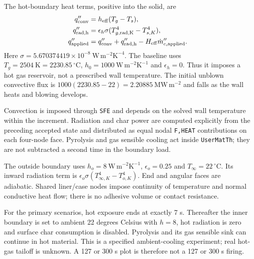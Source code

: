 The hot-boundary heat terms, positive into the solid, are
\begin{align}
 q_{\rm conv}''&=h_{\rm eff}(T_g-T_s),\\
 q_{\rm rad,h}''&=\epsilon_h\sigma(T_{g,\rm rad,K}^4-T_{s,K}^4),\\
 q_{\rm applied}''&=q_{\rm conv}''+q_{\rm rad,h}''-H_{\rm eff}\dot m_{c,\rm applied}''.
\end{align}
Here $\sigma=5.670374419\times10^{-8}\ \mathrm{W\,m^{-2}K^{-4}}$. The baseline uses $T_g=2504\ \mathrm K=2230.85\,^{\circ}\mathrm C$, $h_0=1000\ \mathrm{W\,m^{-2}K^{-1}}$ and $\epsilon_h=0$. Thus it imposes a hot gas reservoir, not a prescribed wall temperature. The initial unblown convective flux is $1000(2230.85-22)=2.20885\ \mathrm{MW\,m^{-2}}$ and falls as the wall heats and blowing develops.

Convection is imposed through \texttt{SFE} and depends on the solved wall temperature within the increment. Radiation and char power are computed explicitly from the preceding accepted state and distributed as equal nodal \texttt{F,HEAT} contributions on each four-node face. Pyrolysis and gas sensible cooling act inside \texttt{UserMatTh}; they are not subtracted a second time in the boundary load.

The outside boundary uses $h_o=8\ \mathrm{W\,m^{-2}K^{-1}}$, $\epsilon_o=0.25$ and $T_\infty=22\,^{\circ}\mathrm C$. Its inward radiation term is $\epsilon_o\sigma(T_{\infty,K}^4-T_{o,K}^4)$. End and angular faces are adiabatic. Shared liner/case nodes impose continuity of temperature and normal conductive heat flow; there is no adhesive volume or contact resistance.

For the primary scenarios, hot exposure ends at exactly 7 s. Thereafter the inner boundary is set to ambient 22 degrees Celsius with $h=8$, hot radiation is zero and surface char consumption is disabled. Pyrolysis and its gas sensible sink can continue in hot material. This is a specified ambient-cooling experiment; real hot-gas tailoff is unknown. A 127 or 300 s plot is therefore not a 127 or 300 s firing.

